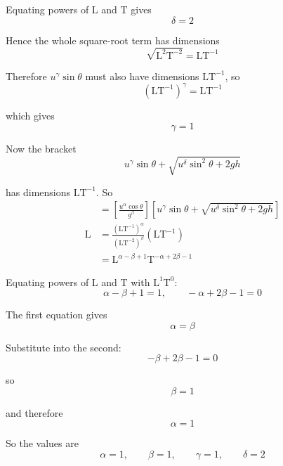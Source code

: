 \documentclass[leqno]{article}
\begin{document}
\begin{enumerate}[
  label=\textbf{\arabic*.},
  leftmargin=*,
  topsep=0pt,
  partopsep=0pt,
  parsep=0pt
]
\begin{djsSolution}
Equating powers of \(\mathrm{L}\) and \(\mathrm{T}\) gives
\[
\delta=2
\]

Hence the whole square-root term has dimensions
\[
\sqrt{\mathrm{L^2T^{-2}}}=\mathrm{LT^{-1}}
\]

Therefore \(u^\gamma\sin\theta\) must also have dimensions \(\mathrm{LT^{-1}}\), so
\[
(\mathrm{LT^{-1}})^\gamma=\mathrm{LT^{-1}}
\]

which gives
\[
\gamma=1
\]

Now the bracket
\[
u^\gamma\sin\theta+\sqrt{u^\delta\sin^2\theta+2gh}
\]

has dimensions \(\mathrm{LT^{-1}}\). So
\begin{align*}
[R]
&=\left[\frac{u^\alpha\cos\theta}{g^\beta}\right]\left[ u^\gamma\sin\theta+\sqrt{u^\delta\sin^2\theta+2gh}\right] \\
\mathrm{L}
&=\frac{(\mathrm{LT^{-1}})^\alpha}{(\mathrm{LT^{-2}})^\beta}(\mathrm{LT^{-1}}) \\
&=\mathrm{L}^{\alpha-\beta+1}\mathrm{T}^{-\alpha+2\beta-1}
\end{align*}

Equating powers of \(\mathrm{L}\) and \(\mathrm{T}\) with \(\mathrm{L^1T^0}\):
\[
\alpha-\beta+1=1,\qquad -\alpha+2\beta-1=0
\]

The first equation gives
\[
\alpha=\beta
\]

Substitute into the second:
\[
-\beta+2\beta-1=0
\]

so
\[
\beta=1
\]

and therefore
\[
\alpha=1
\]

So the values are
\[
\alpha=1,\qquad \beta=1,\qquad \gamma=1,\qquad \delta=2
\]
\end{djsSolution}


\end{enumerate}
\end{document}
